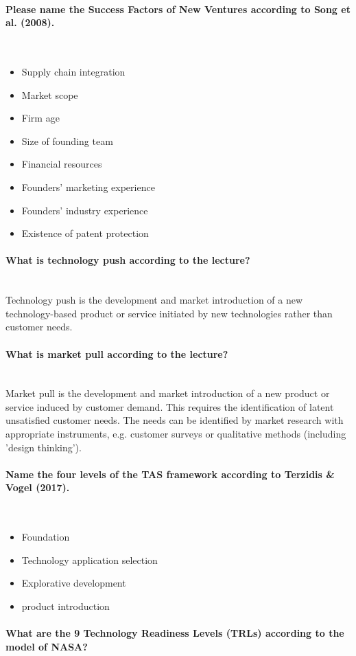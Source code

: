 \documentclass[10pt,a4paper,noendnumber=true]{scrartcl}
\newcommand{\properparagraph}[1]{\paragraph{\textcolor{Emerald}{#1}}\mbox{}\\}
\begin{document}
\properparagraph{Please name the Success Factors of New Ventures according to Song et al. (2008).}
\begin{itemize}
	\item Supply chain integration
	\item Market scope
	\item Firm age
	\item Size of founding team
	\item Financial resources
	\item Founders' marketing experience
	\item Founders' industry experience
	\item Existence of patent protection
\end{itemize}

\properparagraph{What is technology push according to the lecture?}
Technology push is the development and market introduction of a new technology-based product or service initiated by new technologies rather than customer needs.
\properparagraph{What is market pull according to the lecture?}
Market pull is the development and market introduction of a new product or service induced by customer demand. This requires the identification of latent unsatisfied customer needs. The needs can be identified by market research with appropriate instruments, e.g. customer surveys or qualitative methods (including 'design thinking').

\properparagraph{Name the four levels of the TAS framework according to Terzidis \& Vogel (2017).}
\begin{itemize}
	\item Foundation
	\item Technology application selection
	\item Explorative development
	\item product introduction
\end{itemize}
\properparagraph{ What are the 9 Technology Readiness Levels (TRLs) according to the model of NASA?}
\end{document}

